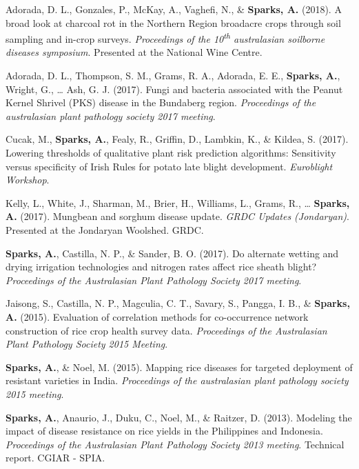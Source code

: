 \documentclass[11pt, a4paper]{awesome-cv}
\begin{document}
\leavevmode\hypertarget{ref-Adorada2018}{}%
Adorada, D. L., Gonzales, P., McKay, A., Vaghefi, N., \& \textbf{Sparks, A.} (2018). A broad look at charcoal rot in the Northern Region broadacre crops through soil sampling and in-crop surveys. \emph{Proceedings of the 10\textsuperscript{th} australasian soilborne diseases symposium}. Presented at the National Wine Centre.

\leavevmode\hypertarget{ref-Adorada2017}{}%
Adorada, D. L., Thompson, S. M., Grams, R. A., Adorada, E. E., \textbf{Sparks, A.}, Wright, G., \ldots{} Ash, G. J. (2017). Fungi and bacteria associated with the Peanut Kernel Shrivel (PKS) disease in the Bundaberg region. \emph{Proceedings of the australasian plant pathology society 2017 meeting}.

\leavevmode\hypertarget{ref-Cucak2017}{}%
Cucak, M., \textbf{Sparks, A.}, Fealy, R., Griffin, D., Lambkin, K., \& Kildea, S. (2017). Lowering thresholds of qualitative plant risk prediction algorithms: Sensitivity versus specificity of Irish Rules for potato late blight development. \emph{Euroblight Workshop}.

\leavevmode\hypertarget{ref-Kelly2017}{}%
Kelly, L., White, J., Sharman, M., Brier, H., Williams, L., Grams, R., \ldots{} \textbf{Sparks, A.} (2017). Mungbean and sorghum disease update. \emph{GRDC Updates (Jondaryan)}. Presented at the Jondaryan Woolshed. GRDC.

\leavevmode\hypertarget{ref-Sparks2017b}{}%
\textbf{Sparks, A.}, Castilla, N. P., \& Sander, B. O. (2017). Do alternate wetting and drying irrigation technologies and nitrogen rates affect rice sheath blight? \emph{Proceedings of the Australasian Plant Pathology Society 2017 meeting}.

\leavevmode\hypertarget{ref-Jaisong2015}{}%
Jaisong, S., Castilla, N. P., Magculia, C. T., Savary, S., Pangga, I. B., \& \textbf{Sparks, A.} (2015). Evaluation of correlation methods for co-occurrence network construction of rice crop health survey data. \emph{Proceedings of the Australasian Plant Pathology Society 2015 Meeting}.

\leavevmode\hypertarget{ref-Sparks2015}{}%
\textbf{Sparks, A.}, \& Noel, M. (2015). Mapping rice diseases for targeted deployment of resistant varieties in India. \emph{Proceedings of the australasian plant pathology society 2015 meeting}.

\leavevmode\hypertarget{ref-Sparks2013}{}%
\textbf{Sparks, A.}, Anaurio, J., Duku, C., Noel, M., \& Raitzer, D. (2013). Modeling the impact of disease resistance on rice yields in the Philippines and Indonesia. \emph{Proceedings of the Australasian Plant Pathology Society 2013 meeting}. Technical report. CGIAR - SPIA.
\end{document}
